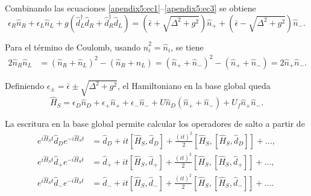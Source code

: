\begin{appendixs}
Combinando las ecuaciones \eqref{apendix5:ec1}–\eqref{apendix5:ec3} se obtiene
\begin{equation*}
    \epsilon_{R} \hat{n}_{R} + \epsilon_{L} \hat{n}_{L}
    + g( \hat{d}^{\dagger}_{L}\hat{d}_{R} + \hat{d}^{\dagger}_{R}\hat{d}_{L} )
    = (\bar{\epsilon} + \sqrt{\Delta^{2} + g^{2}})\hat{n}_{+}
    +  (\bar{\epsilon} - \sqrt{\Delta^{2} + g^{2}})\hat{n}_{-}.
\end{equation*}

Para el término de Coulomb, usando $\hat{n}^{2}_{i} = \hat{n}_{i}$, se tiene
\begin{align*}
    2 \hat{n}_{R}\hat{n}_{L}
    &= (\hat{n}_{R} +\hat{n}_{L})^{2} - (\hat{n}_{R} + \hat{n}_{L})
     = (\hat{n}_{+} +\hat{n}_{-})^{2} - (\hat{n}_{+} + \hat{n}_{-})
     = 2\hat{n}_{+}\hat{n}_{-}.
\end{align*}

Definiendo $\epsilon_{\pm} = \bar{\epsilon} \pm \sqrt{\Delta^{2}+g^{2}}$, el Hamiltoniano en la base global queda
\begin{equation}
    \hat{H}_{S} = \epsilon_{D}\hat{n}_{D} + \epsilon_{+}\hat{n}_{+} + \epsilon_{-}\hat{n}_{-}
    + U\hat{n}_{D}(\hat{n}_{+} + \hat{n}_{-}) + U_{f}\hat{n}_{+}\hat{n}_{-}.
    \label{apendix5:ec4}
\end{equation}

La escritura en la base global permite calcular los operadores de salto a partir de
\begin{align*}
    e^{i \hat{H}_{S}t}\hat{d}_{D}e^{-i\hat{H}_{S}t} & = \hat{d}_{D} + it[\hat{H}_{S},\hat{d}_{D}] + \frac{(it)^{2}}{2} [\hat{H}_{S},[\hat{H}_{S},\hat{d}_{D}]] + \dots, \\
    e^{i \hat{H}_{S}t}\hat{d}_{+}e^{-i\hat{H}_{S}t} & = \hat{d}_{+} + it[\hat{H}_{S},\hat{d}_{+}] + \frac{(it)^{2}}{2} [\hat{H}_{S},[\hat{H}_{S},\hat{d}_{+}]] + \dots, \\
    e^{i \hat{H}_{S}t}\hat{d}_{-}e^{-i\hat{H}_{S}t} & = \hat{d}_{-} + it[\hat{H}_{S},\hat{d}_{-}] + \frac{(it)^{2}}{2} [\hat{H}_{S},[\hat{H}_{S},\hat{d}_{-}]] + \dots.
\end{align*}


\end{appendixs}
